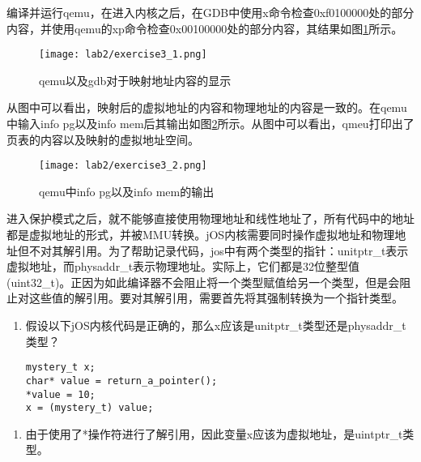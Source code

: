 \begin{exerciseSolution}{3}
    \par 编译并运行qemu，在进入内核之后，在GDB中使用x命令检查0xf0100000处的部分内容，并使用qemu的xp命令检查0x00100000处的部分内容，其结果如图\ref{fig:lab2/exercise3_1}所示。
    \begin{figure}[htb]
        \centering
        \texttt{[image: lab2/exercise3\_1.png]}
        \caption{qemu以及gdb对于映射地址内容的显示}
        \label{fig:lab2/exercise3_1}
    \end{figure}
    \par 从图中可以看出，映射后的虚拟地址的内容和物理地址的内容是一致的。在qemu中输入info pg以及info mem后其输出如图\ref{fig:lab2/exercise3_2}所示。从图中可以看出，qmeu打印出了页表的内容以及映射的虚拟地址空间。
    \begin{figure}[htb]
        \centering
        \texttt{[image: lab2/exercise3\_2.png]}
        \caption{qemu中info pg以及info mem的输出}
        \label{fig:lab2/exercise3_2}
    \end{figure}
\end{exerciseSolution}

\par 进入保护模式之后，就不能够直接使用物理地址和线性地址了，所有代码中的地址都是虚拟地址的形式，并被MMU转换。jOS内核需要同时操作虚拟地址和物理地址但不对其解引用。为了帮助记录代码，jos中有两个类型的指针：unitptr\_t表示虚拟地址，而physaddr\_t表示物理地址。实际上，它们都是32位整型值(uint32\_t)。正因为如此编译器不会阻止将一个类型赋值给另一个类型，但是会阻止对这些值的解引用。要对其解引用，需要首先将其强制转换为一个指针类型。

\begin{questionEnv}
    \begin{enumerate}
        \item 假设以下jOS内核代码是正确的，那么x应该是unitptr\_t类型还是physaddr\_t类型？
            \begin{lstlisting}
mystery_t x;
char* value = return_a_pointer();
*value = 10;
x = (mystery_t) value;
            \end{lstlisting}
    \end{enumerate}
\end{questionEnv}
\begin{answer}
    \begin{enumerate}
        \item 由于使用了*操作符进行了解引用，因此变量x应该为虚拟地址，是uintptr\_t类型。
    \end{enumerate}
\end{answer}


